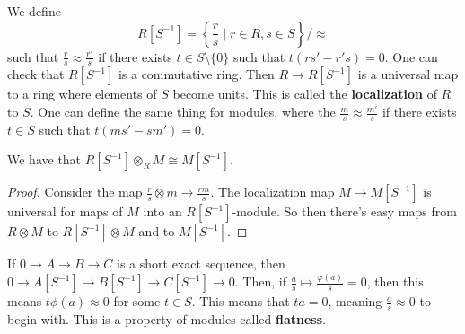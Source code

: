 We define
\[ R[S^{-1}] = \left\{ \frac{r}{s} \mid r \in R, s \in S\right\}/\approx \]
such that $\frac{r}{s} \approx \frac{r'}{s}$ if there exists $t \in S\setminus\{0\}$ such that
$t(rs' - r's) = 0$. One can check that $R[S^{-1}]$ is a commutative ring.
Then $R \to R[S^{-1}]$ is a universal map to a ring where elements of $S$ become units.
This is called the \textbf{localization} of $R$ to $S$. One can define the same
thing for modules, where the $\frac{m}{s} \approx \frac{m'}{s}$ if there exists $t \in S$
such that $t(ms' - sm') = 0$.
\begin{theorem}
    We have that $R[S^{-1}]\otimes_R M \cong M[S^{-1}]$.
    \begin{proof}
        Consider the map $\frac{r}{s} \otimes m \to \frac{rm}{s}$.
        The localization map $M \to M[S^{-1}]$ is universal for maps of $M$
        into an $R[S^{-1}]$-module. So then there's easy maps from $R \otimes M$ to $R[S^{-1}] \otimes M$
        and to $M[S^{-1}]$.
    \end{proof}
\end{theorem}
If $0 \to A \to B \to C$ is a short exact sequence,
then $0 \to A[S^{-1}] \to B[S^{-1}] \to C[S^{-1}] \to 0$.
Then, if $\frac{a}{s} \mapsto \frac{\varphi(a)}{s} = 0$, then this means $t \phi(a) \approx 0$
for some $t \in S$. This means that $ta = 0$, meaning $\frac{a}{s} \approx 0$ to begin with.
This is a property of modules called \textbf{flatness}.

